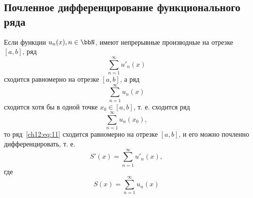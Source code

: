 \subsection{Почленное дифференцирование функционального ряда}

\begin{thm}
	Если функции $u_n(x), n \in \bbN$, имеют непрерывные производные на отрезке $[a, b]$, ряд
	\begin{equation}
		\label{ch12:eq:10}
		\sum_{n=1}^{\infty} u'_n(x)
	\end{equation}
	сходится равномерно на отрезке $[a, b]$, а ряд
	\begin{equation}
		\label{ch12:eq:11}
		\sum_{n=1}^{\infty} u_n(x)
	\end{equation}
	сходится хотя бы в одной точке $x_0 \in [a, b]$, т. е. сходится ряд
	\begin{equation}
		\label{ch12:eq:12}
		\sum_{n=1}^{\infty} u_n(x_0),
	\end{equation}
	то ряд~\eqref{ch12:eq:11} сходится равномерно на отрезке $[a, b]$,
	и его можно почленно дифференцировать, т. е.
	\begin{equation}
		\label{ch12:eq:13}
		S'(x) = \sum_{n=1}^{\infty} u'_n(x),
	\end{equation}
	где
	\begin{equation}
		\label{ch12:eq:14}
		S(x) = \sum_{n=1}^{\infty} u_n(x)
	\end{equation}
\end{thm}
